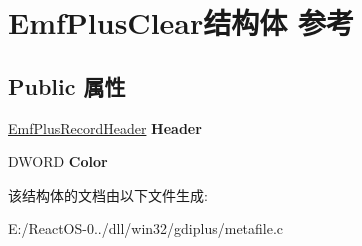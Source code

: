 \hypertarget{struct_emf_plus_clear}{}\section{Emf\+Plus\+Clear结构体 参考}
\label{struct_emf_plus_clear}
\subsection*{Public 属性}
\begin{DoxyCompactItemize}
\item 
\mbox{\label{struct_emf_plus_clear_af2aafc6d63567bf3a048eae8a43cf67c}} 
\hyperlink{struct_emf_plus_record_header}{Emf\+Plus\+Record\+Header} {\bfseries Header}
\item 
\mbox{\label{struct_emf_plus_clear_a787759fc0812fd3e059b52956d04f514}} 
D\+W\+O\+RD {\bfseries Color}
\end{DoxyCompactItemize}


该结构体的文档由以下文件生成\+:\begin{DoxyCompactItemize}
\item 
E\+:/\+React\+O\+S-\/0../dll/win32/gdiplus/metafile.\+c\end{DoxyCompactItemize}
